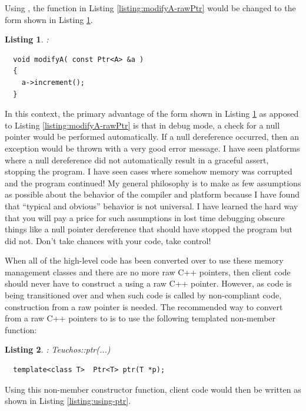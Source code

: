 \documentclass[pdf,ps2pdf,11pt]{SANDreport}
\newtheorem{listing}{Listing}
\begin{document}
Using {}, the function {} in Listing
{}\ref{listing:modifyA-rawPtr} would be changed to the form shown in
Listing {}\ref{listing:modifyA-Ptr}.

\begin{listing}:\\
\label{listing:modifyA-Ptr}
{\small\begin{verbatim}
  void modifyA( const Ptr<A> &a )
  {
    a->increment();
  }
\end{verbatim}}
\end{listing}

In this context, the primary advantage of the form shown in Listing
{}\ref{listing:modifyA-Ptr} as apposed to Listing
{}\ref{listing:modifyA-rawPtr} is that in debug mode, a check for a
null pointer would be performed automatically.  If a null dereference
occurred, then an exception would be thrown with a very good error
message. I have seen platforms where a null dereference did not
automatically result in a graceful assert, stopping the program.  I
have seen cases where somehow memory was corrupted and the program
continued!  My general philosophy is to make as few assumptions as
possible about the behavior of the compiler and platform because I
have found that ``typical and obvious'' behavior is not universal.  I
have learned the hard way that you will pay a price for such
assumptions in lost time debugging obscure things like a null pointer
dereference that should have stopped the program but did not.  Don't
take chances with your code, take control!

When all of the high-level code has been converted over to use these
memory management classes and there are no more raw C++ pointers, then
client code should never have to construct a {} using a
raw C++ pointer.  However, as code is being transitioned over and
when such code is called by non-compliant code, construction from a
raw pointer is needed.  The recommended way to convert from a raw C++
pointers to {} is to use the following templated
non-member function:

\begin{listing}: Teuchos::ptr(...)\\
\label{listing:ptr}
{\small\begin{verbatim}
  template<class T>  Ptr<T> ptr(T *p);
\end{verbatim}}
\end{listing}

Using this non-member constructor function, client code would then be
written as shown in Listing {}\ref{listing:using-ptr}.
\end{document}

